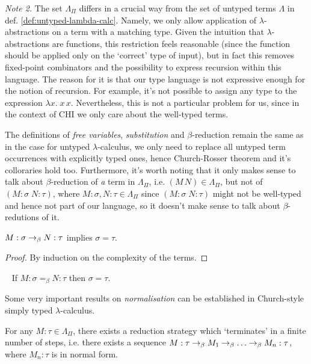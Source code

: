 \emph{Note 2.}
    The set $\Lambda_\Pi$ differs in a crucial way from the set of
    untyped terms $\Lambda$ in def.  \ref{def:untyped-lambda-calc}.
    Namely, we only allow application of $\lambda$-abstractions on a
    term with a matching type.  Given the intuition that
    $\lambda$-abstractions are functions, this restriction feels
    reasonable (since the function should be applied only on the
    `correct' type of input), but in fact this removes fixed-point
    combinators and the possibility to express recursion within this
    language. The reason for it is that our type language is not
    expressive enough for the notion of recursion. For example, it's
    not possible to assign any type to the expression $\lambda x.\; x\,
    x$. Nevertheless, this is not a particular problem for us, since in
    the context of CHI we only care about the well-typed terms.

The definitions of \emph{free variables}, \emph{substitution} and
$\beta$-reduction remain the same as in the case for untyped
$\lambda$-calculus, we only need to replace all untyped term occurrences with
explicitly typed ones, hence Church-Rosser theorem and it's colloraries hold
too. Furthermore, it's worth noting that it only makes sense to talk about
$\beta$-reduction of \emph{a} term in $\Lambda_\Pi$, i.e. $(M\, N) \in
\Lambda_\Pi$, but not of $(M\!:\!\sigma\; N\!:\!\tau)$, where $M:\sigma, N:\tau
\in \Lambda_\Pi$ since $(M\!:\!\sigma\; N\!:\!\tau)$ might not be well-typed
and hence not part of our language, so it doesn't make sense to talk about
$\beta$-redutions of it.

\begin{proposition}
    $M:\sigma \rightarrow_\beta N:\tau$ implies $\sigma = \tau$.
\end{proposition}
\begin{proof}
    By induction on the complexity of the terms.
\end{proof}

\begin{corollary} {\ }
\label{cor:uniquenessoftypes}
    If $M:\sigma =_\beta N:\tau$ then $\sigma = \tau$.
\end{corollary}

Some very important results on \emph{normalisation} can be established in
Church-style simply typed $\lambda$-calculus.
\begin{theorem}\label{thm:weaknorm}
    For any $M:\tau \in \Lambda_\Pi$, there exists a reduction strategy which
    `terminates' in a finite number of steps, i.e. there exists a sequence
    $M:\tau \rightarrow_\beta M_1 \rightarrow_\beta \ldots \rightarrow_\beta M_n:\tau$, where $M_n:\tau$
    is in normal form.
\end{theorem}

